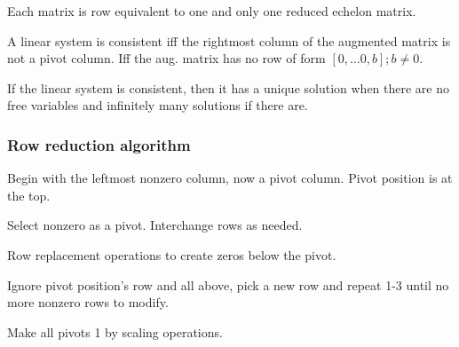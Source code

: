 \begin{card}
    \begin{theorem}
        Each matrix is row equivalent to one and only one reduced
        echelon matrix.
    \end{theorem}

    \begin{theorem}
    A linear system is consistent iff the rightmost column of the
    augmented matrix is not a pivot column. Iff the aug. matrix
    has no row of form
    $[ 0, \dots 0, b ]; b \neq 0$.

    If the linear system is consistent, then it has a unique solution
    when there are no free variables and infinitely many solutions if
    there are.
    \end{theorem}

    \subsubsection{Row reduction algorithm}
    \begin{compactenum}
    \item Begin with the leftmost nonzero column, now a pivot column.
        Pivot position is at the top.
    \item Select nonzero as a pivot. Interchange rows as needed.
    \item Row replacement operations to create zeros below the pivot.
    \item Ignore pivot position's row and all above, pick a new row and repeat 1-3 until no
        more nonzero rows to modify.
    \item Make all pivots 1 by scaling operations.
    \end{compactenum}
\end{card}



